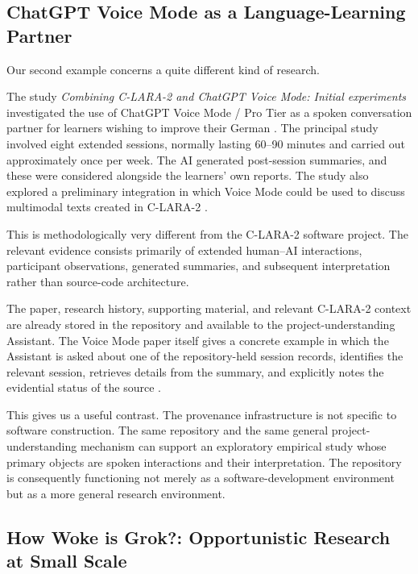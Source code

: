 \documentclass[12pt]{article}
\begin{document}
\subsection{ChatGPT Voice Mode as a Language-Learning Partner}

Our second example concerns a quite different kind of research.

The study \emph{Combining C-LARA-2 and ChatGPT Voice Mode: Initial experiments} investigated the use of ChatGPT Voice Mode / Pro Tier as a spoken conversation partner for learners wishing to improve their German \citep{wrightEtAl2026voice}.
The principal study involved eight extended sessions, normally lasting 60--90 minutes and carried out approximately once per week. The AI generated post-session summaries, and these were considered alongside the learners' own reports. The study also explored a preliminary integration in which Voice Mode could be used to discuss multimodal texts created in C-LARA-2 \citep[Sections~3--4]{wrightEtAl2026voice}.

This is methodologically very different from the C-LARA-2 software project. The relevant evidence consists primarily of extended human--AI interactions, participant observations, generated summaries, and subsequent interpretation rather than source-code architecture.

The paper, research history, supporting material, and relevant C-LARA-2 context are already stored in the repository and available to the project-understanding Assistant. The Voice Mode paper itself gives a concrete example in which the Assistant is asked about one of the repository-held session records, identifies the relevant session, retrieves details from the summary, and explicitly notes the evidential status of the source \citep[Section~5.2]{wrightEtAl2026voice}.

This gives us a useful contrast. The provenance infrastructure is not specific to software construction. The same repository and the same general project-understanding mechanism can support an exploratory empirical study whose primary objects are spoken interactions and their interpretation.
The repository is consequently functioning not merely as a software-development environment but as a more general research environment.


\subsection{How Woke is Grok?: Opportunistic Research at Small Scale}
\end{document}
